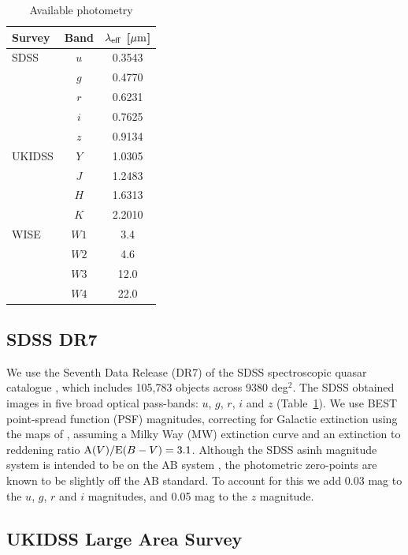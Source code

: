 \begin{table}
  \small
  \centering
  \begin{tabular}{l c c}
    \hline 
    Survey & Band & $\lambda_{\rm eff}$ [$\mu{\rm m}$] \\
    \hline 
    SDSS & $u$ & 0.3543 \\
         & $g$ & 0.4770 \\
         & $r$ & 0.6231 \\
         & $i$ & 0.7625 \\
         & $z$ & 0.9134 \\
    UKIDSS & $Y$ & 1.0305 \\
           & $J$ & 1.2483 \\
           & $H$ & 1.6313 \\
           & $K$ & 2.2010 \\
    WISE & $W1$ & 3.4 \\
         & $W2$ & 4.6 \\
         & $W3$ & 12.0 \\
         & $W4$ & 22.0 \\           
    \hline
  \end{tabular}
  \caption{Available photometry}
  \label{tab:photometry}
\end{table}

\subsection{SDSS DR7}

We use the Seventh Data Release (DR7) of the \ac{SDSS} spectroscopic quasar catalogue \citep{schneider10}, which includes 105,783 objects across 9380 deg$^2$. 
The \ac{SDSS} obtained images in five broad optical pass-bands: $u$, $g$, $r$, $i$ and $z$ (Table~\ref{tab:photometry}).  
We use BEST point-spread function (PSF) magnitudes, correcting for Galactic extinction using the maps of \citet{schlegel98}, assuming a Milky Way (MW) extinction curve \citep{pei92} and an extinction to reddening ratio ${\rm A}(V) / {\rm E}(B-V) = 3.1$. 
Although the SDSS asinh magnitude system is intended to be on the AB system \citep{oke83}, the photometric zero-points are known to be slightly off the AB standard. 
To account for this we add 0.03 mag to the $u$, $g$, $r$ and $i$ magnitudes, and 0.05 mag to the $z$ magnitude.  

\subsection{UKIDSS Large Area Survey}

